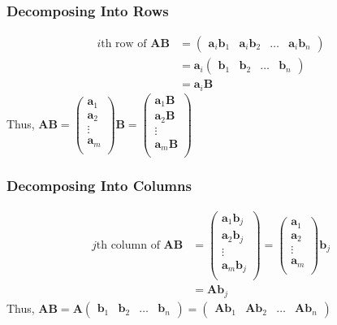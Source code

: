 \documentclass[../ma2001_notes.tex]{subfiles}
\begin{document}
\subsubsection{Decomposing Into Rows}
\begin{align*}
	i\text{th row of }\bm{AB}
	&=\begin{pmatrix}
		\bm{a}_i\bm{b}_1 & \bm{a}_i\bm{b}_2 & \ldots & \bm{a}_i\bm{b}_n
	\end{pmatrix} \\
	&=\bm{a}_i\begin{pmatrix}
		\bm{b}_1 &\bm{b}_2 & \ldots & \bm{b}_n
	\end{pmatrix} \\
	&=\bm{a}_i\bm{B}
\end{align*}
Thus,
\(\bm{AB}
=\begin{pmatrix}
	\bm{a}_1 \\
	\bm{a}_2 \\
	\vdots \\
	\bm{a}_m \\
\end{pmatrix}\bm{B}
=\begin{pmatrix}
	\bm{a}_1\bm{B} \\
	\bm{a}_2\bm{B} \\
	\vdots \\
	\bm{a}_m\bm{B} \\
\end{pmatrix}\)

\subsubsection{Decomposing Into Columns}
\begin{align*}
	j\text{th column of }\bm{AB}
	&=\begin{pmatrix}
		\bm{a}_1\bm{b}_j \\
		\bm{a}_2\bm{b}_j \\
		\vdots \\
		\bm{a}_m\bm{b}_j \\
	\end{pmatrix}
	=\begin{pmatrix}
		\bm{a}_1 \\
		\bm{a}_2 \\
		\vdots \\
		\bm{a}_m \\
	\end{pmatrix}\bm{b}_j \\
	&=\bm{A}\bm{b}_j
\end{align*}
Thus, \(\bm{AB}
	=\bm{A}\begin{pmatrix}
		\bm{b}_1 & \bm{b}_2 & \ldots & \bm{b}_n
	\end{pmatrix}
	=\begin{pmatrix}
		\bm{Ab}_1 & \bm{Ab}_2 & \ldots & \bm{Ab}_n
	\end{pmatrix}\)
\end{document}
